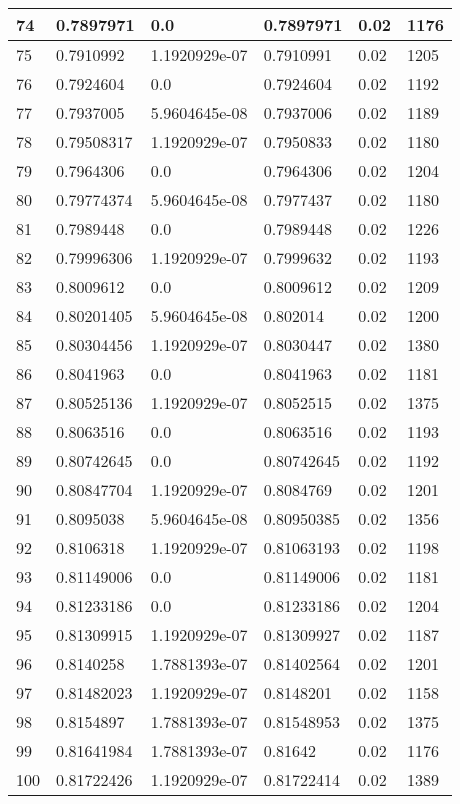 \begin{longtable}{|l|l|l|l|l|l|}
74 & 0.7897971 & 0.0 & 0.7897971 & 0.02 & 1176 \\ \hline 
75 & 0.7910992 & 1.1920929e-07 & 0.7910991 & 0.02 & 1205 \\ \hline 
76 & 0.7924604 & 0.0 & 0.7924604 & 0.02 & 1192 \\ \hline 
77 & 0.7937005 & 5.9604645e-08 & 0.7937006 & 0.02 & 1189 \\ \hline 
78 & 0.79508317 & 1.1920929e-07 & 0.7950833 & 0.02 & 1180 \\ \hline 
79 & 0.7964306 & 0.0 & 0.7964306 & 0.02 & 1204 \\ \hline 
80 & 0.79774374 & 5.9604645e-08 & 0.7977437 & 0.02 & 1180 \\ \hline 
81 & 0.7989448 & 0.0 & 0.7989448 & 0.02 & 1226 \\ \hline 
82 & 0.79996306 & 1.1920929e-07 & 0.7999632 & 0.02 & 1193 \\ \hline 
83 & 0.8009612 & 0.0 & 0.8009612 & 0.02 & 1209 \\ \hline 
84 & 0.80201405 & 5.9604645e-08 & 0.802014 & 0.02 & 1200 \\ \hline 
85 & 0.80304456 & 1.1920929e-07 & 0.8030447 & 0.02 & 1380 \\ \hline 
86 & 0.8041963 & 0.0 & 0.8041963 & 0.02 & 1181 \\ \hline 
87 & 0.80525136 & 1.1920929e-07 & 0.8052515 & 0.02 & 1375 \\ \hline 
88 & 0.8063516 & 0.0 & 0.8063516 & 0.02 & 1193 \\ \hline 
89 & 0.80742645 & 0.0 & 0.80742645 & 0.02 & 1192 \\ \hline 
90 & 0.80847704 & 1.1920929e-07 & 0.8084769 & 0.02 & 1201 \\ \hline 
91 & 0.8095038 & 5.9604645e-08 & 0.80950385 & 0.02 & 1356 \\ \hline 
92 & 0.8106318 & 1.1920929e-07 & 0.81063193 & 0.02 & 1198 \\ \hline 
93 & 0.81149006 & 0.0 & 0.81149006 & 0.02 & 1181 \\ \hline 
94 & 0.81233186 & 0.0 & 0.81233186 & 0.02 & 1204 \\ \hline 
95 & 0.81309915 & 1.1920929e-07 & 0.81309927 & 0.02 & 1187 \\ \hline 
96 & 0.8140258 & 1.7881393e-07 & 0.81402564 & 0.02 & 1201 \\ \hline 
97 & 0.81482023 & 1.1920929e-07 & 0.8148201 & 0.02 & 1158 \\ \hline 
98 & 0.8154897 & 1.7881393e-07 & 0.81548953 & 0.02 & 1375 \\ \hline 
99 & 0.81641984 & 1.7881393e-07 & 0.81642 & 0.02 & 1176 \\ \hline 
100 & 0.81722426 & 1.1920929e-07 & 0.81722414 & 0.02 & 1389 \\ \hline 
\end{longtable}